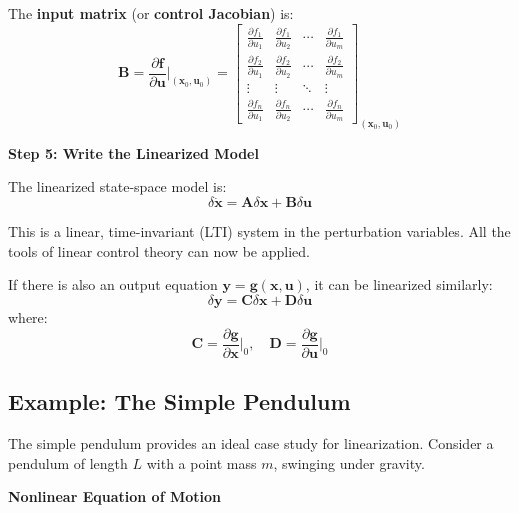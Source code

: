 The \textbf{input matrix} (or \textbf{control Jacobian}) is:
\begin{equation}
\mathbf{B} = \frac{\partial \mathbf{f}}{\partial \mathbf{u}}\bigg|_{(\mathbf{x}_0, \mathbf{u}_0)} =
\begin{bmatrix}
\frac{\partial f_1}{\partial u_1} & \frac{\partial f_1}{\partial u_2} & \cdots & \frac{\partial f_1}{\partial u_m} \\
\frac{\partial f_2}{\partial u_1} & \frac{\partial f_2}{\partial u_2} & \cdots & \frac{\partial f_2}{\partial u_m} \\
\vdots & \vdots & \ddots & \vdots \\
\frac{\partial f_n}{\partial u_1} & \frac{\partial f_n}{\partial u_2} & \cdots & \frac{\partial f_n}{\partial u_m}
\end{bmatrix}_{(\mathbf{x}_0, \mathbf{u}_0)}
\label{eq:B_matrix}
\end{equation}

\textbf{Step 5: Write the Linearized Model}

The linearized state-space model is:
\begin{equation}
\boxed{\delta\dot{\mathbf{x}} = \mathbf{A}\delta\mathbf{x} + \mathbf{B}\delta\mathbf{u}}
\label{eq:linearized_model}
\end{equation}

This is a linear, time-invariant (LTI) system in the perturbation variables. All the tools of linear control theory can now be applied.

If there is also an output equation $\mathbf{y} = \mathbf{g}(\mathbf{x}, \mathbf{u})$, it can be linearized similarly:
\begin{equation}
\delta\mathbf{y} = \mathbf{C}\delta\mathbf{x} + \mathbf{D}\delta\mathbf{u}
\end{equation}
where:
\begin{equation}
\mathbf{C} = \frac{\partial \mathbf{g}}{\partial \mathbf{x}}\bigg|_0, \quad \mathbf{D} = \frac{\partial \mathbf{g}}{\partial \mathbf{u}}\bigg|_0
\end{equation}

\subsection{Example: The Simple Pendulum}

The simple pendulum provides an ideal case study for linearization. Consider a pendulum of length $L$ with a point mass $m$, swinging under gravity.

\textbf{Nonlinear Equation of Motion}

